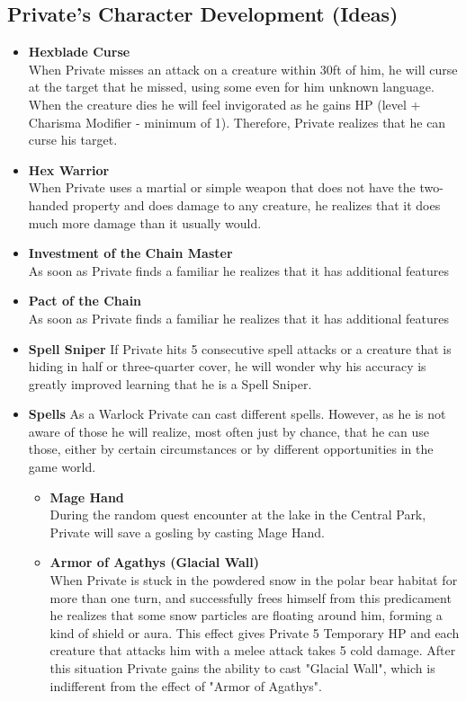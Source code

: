 \subsection*{Private's Character Development (Ideas)}
\begin{itemize}
	\item \textbf{Hexblade Curse}\\
	When Private misses an attack on a creature within 30ft of him, he will curse at the target that he missed, using some even for him unknown language. When the creature dies he will feel invigorated as he gains HP (level + Charisma Modifier - minimum of 1). Therefore, Private realizes that he can curse his target.
	\item \textbf{Hex Warrior}\\
	When Private uses a martial or simple weapon that does not have the two-handed property and does damage to any creature, he realizes that it does much more damage than it usually would.
	\item \textbf{Investment of the Chain Master}\\
	As soon as Private finds a familiar he realizes that it has additional features
	\item \textbf{Pact of the Chain}\\
	As soon as Private finds a familiar he realizes that it has additional features
	\item \textbf{Spell Sniper}
	If Private hits 5 consecutive spell attacks or a creature that is hiding in half or three-quarter cover, he will wonder why his accuracy is greatly improved learning that he is a Spell Sniper.
	\item \textbf{Spells}
	As a Warlock Private can cast different spells. However, as he is not aware of those he will realize, most often just by chance, that he can use those, either by certain circumstances or by different opportunities in the game world.
	\begin{itemize}
		\item \textcolor{titlered}{\textbf{Mage Hand}}\\
		During the random quest encounter at the lake in the Central Park, Private will save a gosling by casting Mage Hand.
		\item \textcolor{titlered}{\textbf{Armor of Agathys (Glacial Wall)}}\\
		When Private is stuck in the powdered snow in the polar bear habitat for more than one turn, and successfully frees himself from this predicament he realizes that some snow particles are floating around him, forming a kind of shield or aura. This effect gives Private 5 Temporary HP and each creature that attacks him with a melee attack takes 5 cold damage. After this situation Private gains the ability to cast "Glacial Wall", which is indifferent from the effect of "Armor of Agathys".

\end{itemize}
\end{itemize}
